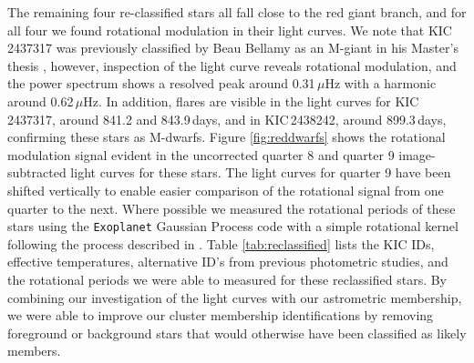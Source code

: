 The remaining four re-classified stars all fall close to the red giant branch, and for all four we found rotational modulation in their light curves. We note that KIC\,2437317 was previously classified by Beau Bellamy as an M-giant in his Master's thesis \citep{bellamy_using_2015}, however, inspection of the light curve reveals rotational modulation, and the power spectrum shows a resolved peak around 0.31\,$\mu$Hz with a harmonic around 0.62\,$\mu$Hz. In addition, flares are visible in the light curves for KIC\,2437317, around 841.2 and 843.9\,days, and in KIC\,2438242, around 899.3\,days, confirming these stars as M-dwarfs. Figure \ref{fig:reddwarfs} shows the rotational modulation signal evident in the uncorrected quarter 8 and quarter 9 image-subtracted light curves for these stars. The light curves for quarter 9 have been shifted vertically to enable easier comparison of the rotational signal from one quarter to the next. Where possible we measured the rotational periods of these stars using the \texttt{Exoplanet} Gaussian Process code with a simple rotational kernel following the process described in \cite{foreman-mackey_fast_2017}. Table \ref{tab:reclassified} lists the KIC IDs, effective temperatures, alternative ID's from previous photometric studies, and the rotational periods we were able to measured for these reclassified stars. By combining our investigation of the \Kepler{} light curves with our astrometric membership, we were able to improve our cluster membership identifications by removing foreground or background stars that would otherwise have been classified as likely members.

